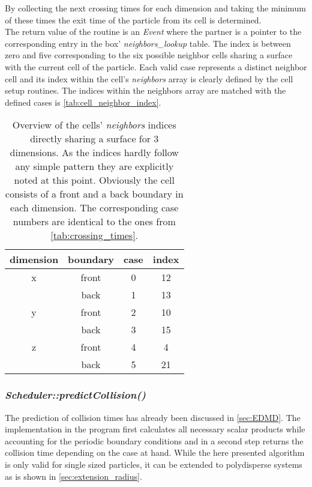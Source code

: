 By collecting the next crossing times for each dimension and taking the minimum of these times the exit time of the particle from its cell is determined.\\

The return value of the routine is an \textit{Event} where the partner is a pointer to the corresponding entry in the box' \textit{neighbors\_lookup} table. The index is between zero and five corresponding to the six possible neighbor cells sharing a surface with the current cell of the particle. Each valid case represents a distinct neighbor cell and its index within the cell's \textit{neighbors} array is clearly defined by the cell setup routines. The indices within the neighbors array are matched with the defined cases is \autoref{tab:cell_neighbor_index}. 

\begin{table}[h]
\centering
\begin{tabular}{c|c|c|c}
dimension & boundary & case & index \\ \hline
x & front & 0 & 12 \\
 & back & 1 & 13 \\ \hline
y & front & 2 & 10 \\
 & back & 3 & 15 \\ \hline
z & front & 4 & 4 \\
 & back & 5 & 21 \\
\end{tabular}
\caption[Lookup table of cell neighbor indices]{Overview of the cells' \textit{neighbors} indices directly sharing a surface for 3 dimensions. As the indices hardly follow any simple pattern they are explicitly noted at this point. Obviously the cell consists of a front and a back boundary in each dimension. The corresponding case numbers are identical to the ones from \autoref{tab:crossing_times}.}
\label{tab:cell_neighbor_index}
\end{table}

\subsubsection{\quad \textit{Scheduler::predictCollision()}}
The prediction of collision times has already been discussed in \autoref{sec:EDMD}. The implementation in the program first calculates all necessary scalar products while accounting for the periodic boundary conditions and in a second step returns the collision time depending on the case at hand. While the here presented algorithm is only valid for single sized particles, it can be extended to polydisperse systems as is shown in \autoref{sec:extension_radius}.\\

